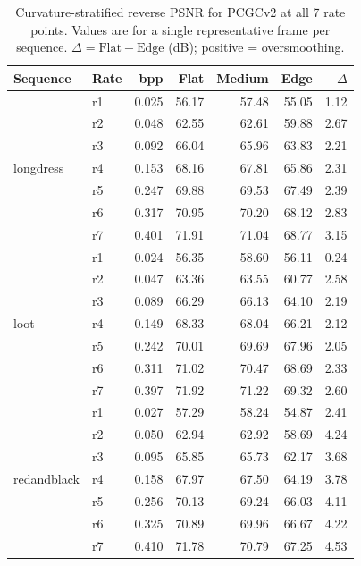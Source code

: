 \begin{table}[t]
  \centering
  \caption{%
    Curvature-stratified reverse PSNR for PCGCv2 at all 7 rate points.
    Values are for a single representative frame per sequence.
    $\Delta = \text{Flat} - \text{Edge}$ (dB); positive = oversmoothing.
  }
  \label{tab:full-oversmoothing}
  \small
  \setlength{\tabcolsep}{4pt}
  \begin{tabular}{llrrrrr}
    \toprule
    Sequence & Rate & bpp & Flat & Medium & Edge & $\Delta$ \\
    \midrule
    \multirow{7}{*}{longdress}
      & r1 & 0.025 & 56.17 & 57.48 & 55.05 & 1.12 \\
      & r2 & 0.048 & 62.55 & 62.61 & 59.88 & 2.67 \\
      & r3 & 0.092 & 66.04 & 65.96 & 63.83 & 2.21 \\
      & r4 & 0.153 & 68.16 & 67.81 & 65.86 & 2.31 \\
      & r5 & 0.247 & 69.88 & 69.53 & 67.49 & 2.39 \\
      & r6 & 0.317 & 70.95 & 70.20 & 68.12 & 2.83 \\
      & r7 & 0.401 & 71.91 & 71.04 & 68.77 & 3.15 \\
    \midrule
    \multirow{7}{*}{loot}
      & r1 & 0.024 & 56.35 & 58.60 & 56.11 & 0.24 \\
      & r2 & 0.047 & 63.36 & 63.55 & 60.77 & 2.58 \\
      & r3 & 0.089 & 66.29 & 66.13 & 64.10 & 2.19 \\
      & r4 & 0.149 & 68.33 & 68.04 & 66.21 & 2.12 \\
      & r5 & 0.242 & 70.01 & 69.69 & 67.96 & 2.05 \\
      & r6 & 0.311 & 71.02 & 70.47 & 68.69 & 2.33 \\
      & r7 & 0.397 & 71.92 & 71.22 & 69.32 & 2.60 \\
    \midrule
    \multirow{7}{*}{redandblack}
      & r1 & 0.027 & 57.29 & 58.24 & 54.87 & 2.41 \\
      & r2 & 0.050 & 62.94 & 62.92 & 58.69 & 4.24 \\
      & r3 & 0.095 & 65.85 & 65.73 & 62.17 & 3.68 \\
      & r4 & 0.158 & 67.97 & 67.50 & 64.19 & 3.78 \\
      & r5 & 0.256 & 70.13 & 69.24 & 66.03 & 4.11 \\
      & r6 & 0.325 & 70.89 & 69.96 & 66.67 & 4.22 \\
      & r7 & 0.410 & 71.78 & 70.79 & 67.25 & 4.53 \\

\end{tabular}
\end{table}
